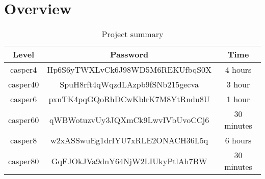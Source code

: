 \section{Overview}
\begin{table}[h]
	\centering
	\begin{tabular}{|c|c|c|}
		\hline
		\textbf{Level} & \textbf{Password} 								& \textbf{Time} \\ \hline
		casper4        & Hp6S6yTWXLvCk6J98WD5M6REKUfbqS0X               & 4 hours       \\ \hline
		casper40       & SpuH8rft4qWqzdLAzpb9fSNb215gecva				& 3 hour        \\ \hline
		casper6        & pxnTK4pqGQoRhDCwKblrK7M8YtRndu8U				& 1 hour        \\ \hline
		casper60       & qWBWotuzvUy3JQXmCk9LwvIVbUvoCCj6				& 30 minutes    \\ \hline
		casper8		   & w2xASSwuEg1drIYU7xRLE2ONACH36L5q				& 6 hours		\\ \hline
		casper80	   & GqFJOkJVa9dnY64NjW2LIUkyPtlAh7BW				& 30 minutes	\\ \hline
	\end{tabular}
	\caption{Project summary}
	\label{tbl:summary}
\end{table}